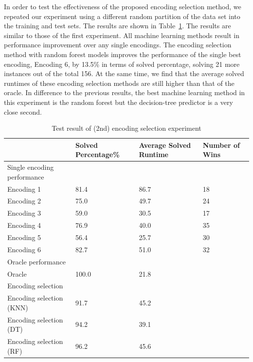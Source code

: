 \documentclass{new_tlp}
\begin{document}
In order to test the effectiveness of the proposed encoding selection method, 
we repeated our experiment using a different random partition of the data set 
into the training and test sets. The results are shown in Table~\ref{ecresult2}.
The results are similar to those of the first experiment. All machine learning 
methods result in performance improvement over any single encodings. The 
encoding selection method with random forest models improves the performance 
of the single best encoding, Encoding 6, by 13.5\% in terms of solved 
percentage, solving 21 more instances out of the total 156. At the same time, 
we find that the average solved runtimes of these encoding selection methods 
are still higher than that of the oracle. In difference to the previous results,
the best machine learning method in this experiment is the random forest but 
the decision-tree predictor is a very close second. 

\begin{table}[]
	\caption{Test result of (2nd) encoding selection experiment} \label{ecresult2}
	\programmath
	\begin{tabular}{llll}
		\hline\hline
		& Solved Percentage\% & Average Solved Runtime & Number of Wins \\ \hline%
		Single encoding performance & & &                                     \\ %
		Encoding 1        & 81.4&86.7                      & 18            \\ %
		Encoding 2        & 75.0 & 49.7                      & 24            \\ %
		Encoding 3        & 59.0&30.5                       & 17            \\ %
		Encoding 4        & 76.9&40.0                      & 35            \\ %
		Encoding 5        & 56.4&25.7                      & 30            \\ %
		Encoding 6        & 82.7&51.0                      & 32            \\\hline %
		Oracle performance  & & &                                               \\ %
		Oracle            & 100.0           & 21.8                      &               \\ \hline
		Encoding selection & & &                                                \\ %
		Encoding selection (KNN) & 91.7&45.2                    &               \\ %
		Encoding selection (DT) & 94.2&39.1      &               \\ %
		Encoding selection (RF) & 96.2&45.6	      &               \\ %
		\hline\hline
	\end{tabular}
	\programmath
\end{table}
\end{document}
